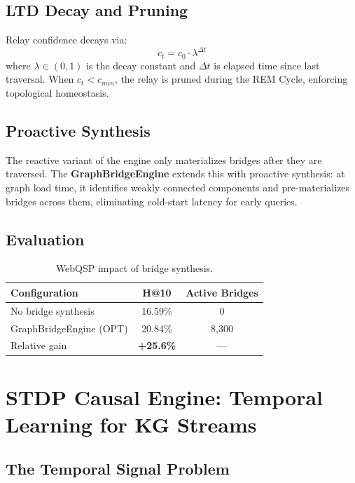 \documentclass[10pt,twocolumn]{article}
\begin{document}
\subsection{LTD Decay and Pruning}

Relay confidence decays via:
\begin{equation}
c_t = c_0 \cdot \lambda^{\Delta t}
\label{eq:decay}
\end{equation}
where $\lambda \in (0,1)$ is the decay constant and $\Delta t$ is elapsed time since
last traversal. When $c_t < c_{min}$, the relay is pruned during the REM Cycle,
enforcing topological homeostasis.

\subsection{Proactive Synthesis}

The reactive variant of the engine only materializes bridges after they are traversed.
The \textbf{GraphBridgeEngine} extends this with proactive synthesis: at graph load time,
it identifies weakly connected components and pre-materializes bridges across them,
eliminating cold-start latency for early queries.

\subsection{Evaluation}

\begin{table}[h]
\small\centering
\caption{WebQSP impact of bridge synthesis.}
\label{tab:bridge}
\begin{tabular}{lcc}
\toprule
\textbf{Configuration} & \textbf{H@10} & \textbf{Active Bridges} \\
\midrule
No bridge synthesis         & 16.59\% & 0 \\
GraphBridgeEngine (OPT)     & 20.84\% & 8,300 \\
\midrule
Relative gain & \textbf{+25.6\%} & — \\
\bottomrule
\end{tabular}
\end{table}

\section{STDP Causal Engine: Temporal Learning for KG Streams}
\label{sec:stdp}

\subsection{The Temporal Signal Problem}
\end{document}
